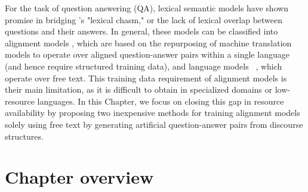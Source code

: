 



For the task of question answering (QA), lexical semantic models have shown promise in bridging \citet{Berger:00}'s "lexical chasm," or the lack of lexical overlap between questions and their answers.  In general, these models can be classified into alignment models \citep{echihabi2003noisy,Soricut:06,Riezler:etal:2007,Surdeanu:11,yao2013}, which are based on the repurposing of machine translation models to operate over aligned question-answer pairs within a single language (and hence require structured training data), and language models ~\citep{jansen14,sultan-etal:2014:TACL,yih13}, which operate over free text.  
This training data requirement of alignment models is their main limitation, as it is difficult to obtain in specialized domains or low-resource languages.
In this Chapter, we focus on closing this gap in resource availability by proposing two inexpensive methods for training alignment models solely using free text by generating artificial question-answer pairs from discourse structures. 

\section{Chapter overview}

